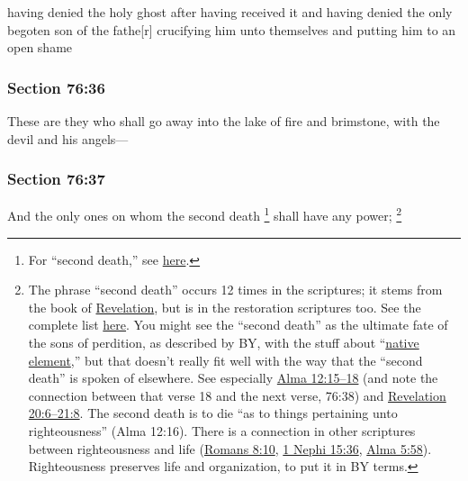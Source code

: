 		\begin{framed}
		\scriptsize
			\begin{compactdesc}
				\item[JSP] having denied the holy ghost after having received it and having denied the only begoten son of the fathe[r] crucifying him unto themselves and putting him to an open shame
			\end{compactdesc}
		\end{framed}

	\subsubsection{Section 76:36} %
		\label{DC76-36}

		These are they who shall go away into the lake of fire and brimstone, with the devil and his angels---


	\subsubsection{Section 76:37} %
		\label{DC76-37}

		And the only ones on whom the second death%
			\footnote{%
				For ``second death,'' see \hyperref[DEATH-PHRASES]{here}.
				}
		shall have any power;%
			\footnote{%
				The phrase ``second death'' occurs 12 times in the scriptures; it stems from the book of \hyperref[REVELATIONNT]{Revelation}, but is in the restoration scriptures too. See the complete list \hyperref[DEATH-PHRASES]{here}. You might see the ``second death'' as the ultimate fate of the sons of perdition, as described by BY, with the stuff about ``\hyperref[NATIVEELEMENT]{native element},'' but that doesn't really fit well with the way that the ``second death'' is spoken of elsewhere. See especially \hyperref[ALMA-12-15]{Alma 12:15--18} (and note the connection between that verse 18 and the next verse, 76:38) and \hyperref[REVELATIONNT-20-6]{Revelation 20:6--21:8}. The second death is to die ``as to things pertaining unto righteousness'' (Alma 12:16). There is a connection in other scriptures between righteousness and life (\hyperref[ROMANS-8-10]{Romans 8:10}, \hyperref[1NEPHI-15-36]{1 Nephi 15:36}, \hyperref[ALMA-5-58]{Alma 5:58}). Righteousness preserves life and organization, to put it in BY terms.
				} 

